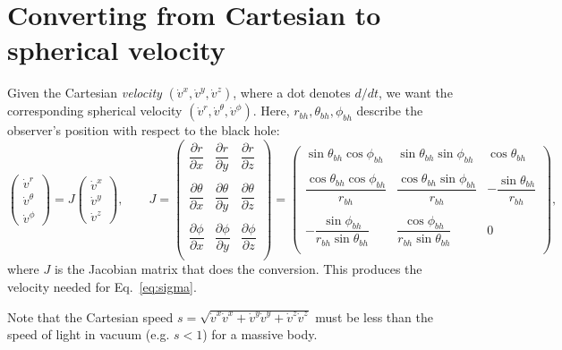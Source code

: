\documentclass[10pt]{article}
\theoremstyle{definition}
\theoremstyle{remark}
\begin{document}
\section{Converting from Cartesian to spherical velocity}
Given the Cartesian \emph{velocity} $(\dot v^x,\dot v^y,\dot v^z)$, where a dot
denotes $d/dt$, we want the corresponding spherical velocity
$(\dot v^r,\dot v^\theta,\dot v^\phi)$.
Here, $r_{bh}, \theta_{bh}, \phi_{bh}$ describe the observer's position with respect to the black hole:
\begin{equation}
\begin{pmatrix} \dot v^r \\[2pt] \dot v^\theta \\[2pt] \dot v^\phi \end{pmatrix}
=
J
\begin{pmatrix} \dot v^x \\[2pt] \dot v^y \\[2pt] \dot v^z \end{pmatrix},
\qquad
J =
\begin{pmatrix}
\dfrac{\partial r}{\partial x} & \dfrac{\partial r}{\partial y} & \dfrac{\partial r}{\partial z} \\ \\
\dfrac{\partial \theta}{\partial x} & \dfrac{\partial \theta}{\partial y} & \dfrac{\partial \theta}{\partial z} \\ \\
\dfrac{\partial \phi}{\partial x} & \dfrac{\partial \phi}{\partial y} & \dfrac{\partial \phi}{\partial z} \\
\end{pmatrix} =
\begin{pmatrix}
\sin\theta_{bh}\cos\phi_{bh} & \sin\theta_{bh}\sin\phi_{bh} & \cos\theta_{bh} \\ \\
\dfrac{\cos\theta_{bh}\cos\phi_{bh}}{r_{bh}} & \dfrac{\cos\theta_{bh}\sin\phi_{bh}}{r_{bh}} & -\dfrac{\sin\theta_{bh}}{r_{bh}} \\ \\
-\dfrac{\sin\phi_{bh}}{r_{bh}\sin\theta_{bh}} & \dfrac{\cos\phi_{bh}}{r_{bh}\sin\theta_{bh}} & 0 \\
\end{pmatrix},
\end{equation}
where $J$ is the Jacobian matrix that does the conversion.
This produces the velocity needed for Eq.~\eqref{eq:sigma}.

Note that the Cartesian speed $s = \sqrt{\dot v^x \dot v^x + \dot v^y \dot v^y + \dot v^z \dot v^z}$ must be less than the speed of light in vacuum (e.g. $s < 1$) for a massive body.
\end{document}
